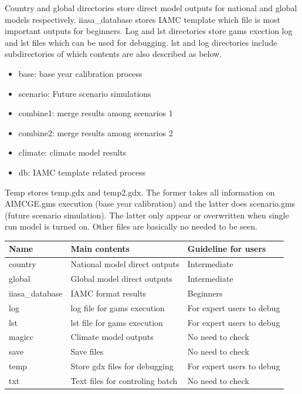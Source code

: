 \documentclass[10pt,a4paper,titlepage,dvipdfmx]{book}
\begin{document}
Country and global directories store direct model outputs for national and global models respectively. iiasa\_database stores IAMC template which file is most important outputs for beginners.
Log and lst directories store gams exection log and lst files which can be used for debugging. lst and log directories include subdirectories of which contents are also described as below.  
\begin{itemize}
\item base: base year calibration process 
\item scenario: Future scenario simulations 
\item combine1: merge results among scenarios 1
\item combine2: merge results among scenarios 2
\item climate: climate model results
\item db: IAMC template related process
\end{itemize}
  Temp stores temp.gdx and temp2.gdx. 
The former takes all information on AIMCGE.gms execution (base year calibration) and the latter does scenario.gms (future scenario simulation). The latter only appear or overwritten when single run model is turned on. Other files are basically no needed to be seen.


\begin{tabularx}{\textwidth}{|
p{}|
p{}|
p{}|} 
\caption{\label{tab:LisDirOut} list of directories in ''output''} \\
\hline 
Name & Main contents & Guideline for users \\\hline 
country & National model direct outputs & Intermediate \\\hline 
global & Global model direct outputs & Intermediate \\\hline 
iiasa\_database & IAMC format results & Beginners \\\hline 
log & log file for gams execution & For expert users to debug \\\hline 
lst & lst file for gams execution & For expert users to debug \\\hline 
magicc & Climate model outputs & No need to check \\\hline 
save & Save files & No need to check \\\hline 
temp & Store gdx files for debugging & For expert users to debug \\\hline 
txt & Text files for controling batch & No need to check \\\hline 
\end{tabularx}
\end{document}
